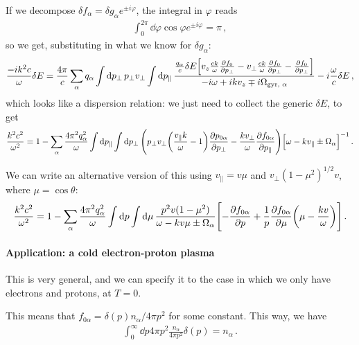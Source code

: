 \documentclass[main.tex]{subfiles}
\begin{document}
If we decompose \(\delta f_\alpha  = \delta g_\alpha e^{\pm i \varphi }\), the integral in \(\varphi \) reads 
%
\begin{align}
\int_0^{2 \pi } \dd{\varphi } \cos \varphi e^{\pm i \varphi } = \pi 
\,,
\end{align}
%
so we get, substituting in what we know for \(\delta g_\alpha \): 
%
\begin{align}
\frac{- i k^2 c}{\omega } \delta E = \frac{4 \pi }{c} 
\sum _{\alpha } q_\alpha \int \dd{p_\perp} p_\perp v_\perp \int \dd{p_\parallel} 
\frac{\frac{q_\alpha}{c} \delta E \qty[v_z \frac{ck}{\omega } \pdv{f_0 }{p_\perp} - v_\perp \frac{ck}{\omega } \pdv{f_0 }{p_\perp} - \pdv{f_0 }{p_\perp}]}{- i \omega + i k v_z \mp i \Omega _{\text{gyr, } \alpha }}
- i \frac{\omega}{c} \delta E
\,,
\end{align}
%
which looks like a dispersion relation: we just need to collect the generic \(\delta E\), to get 
%
\begin{align}
\frac{k^2 c^2}{\omega^2} = 1 - \sum _{\alpha } \frac{4 \pi^2 q_\alpha^2}{\omega } \int \dd{p_\parallel} \int \dd{p_\perp} \qty( p_\perp v_\perp \qty(\frac{v_\parallel k}{\omega } - 1) \pdv{p_{0 \alpha }}{p_\perp} - \frac{k v_\perp}{\omega } \pdv{f_{0 \alpha }}{p_\parallel}) \qty[ \omega - k v_\parallel \pm \Omega _\alpha ]^{-1}
\,.
\end{align}

We can write an alternative version of this using \(v_\parallel = v \mu \) and \(v_\perp (1 - \mu^2)^{1/2} v\), where \(\mu = \cos \theta \): 
\begin{align}
\frac{k^2 c^2}{\omega^2} = 1 - \sum _{\alpha } \frac{4 \pi^2 q_\alpha^2}{\omega } \int \dd{p} \int \dd{\mu } \frac{p^2 v (1 - \mu^2)}{\omega - kv \mu \pm \Omega _\alpha }
\qty[- \pdv{f_{0 \alpha }}{p} + \frac{1}{p} \pdv{f_{0 \alpha }}{\mu } \qty(\mu - \frac{kv}{\omega })]
\,.
\end{align}

\paragraph{Application: a cold electron-proton plasma}

This is very general, and we can specify it to the case in which we only have electrons and protons, at \(T = 0\). 

This means that \(f_{0 \alpha } = \delta (p) n_\alpha / 4 \pi p^2\) for some constant. 
This way, we have 
%
\begin{align}
\int_0^{\infty } \dd{p} 4 \pi p^2 \frac{n_\alpha}{4 \pi p^2} \delta (p) = n_\alpha 
\,.
\end{align}
\end{document}

